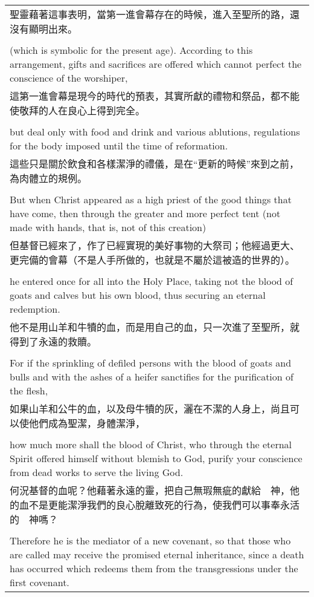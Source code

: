 \begin{tabularx}{\textwidth}{p{}}
聖靈藉著這事表明，當第一進會幕存在的時候，進入至聖所的路，還沒有顯明出來。 \\ \\
(which is symbolic for the present age). According to this arrangement, gifts and sacrifices are offered which cannot perfect the conscience of the worshiper, \\
這第一進會幕是現今的時代的預表，其實所獻的禮物和祭品，都不能使敬拜的人在良心上得到完全。 \\ \\
but deal only with food and drink and various ablutions, regulations for the body imposed until the time of reformation. \\
這些只是關於飲食和各樣潔淨的禮儀，是在“更新的時候”來到之前，為肉體立的規例。 \\ \\
But when Christ appeared as a high priest of the good things that have come, then through the greater and more perfect tent (not made with hands, that is, not of this creation) \\
但基督已經來了，作了已經實現的美好事物的大祭司；他經過更大、更完備的會幕（不是人手所做的，也就是不屬於這被造的世界的）。 \\ \\
he entered once for all into the Holy Place, taking not the blood of goats and calves but his own blood, thus securing an eternal redemption. \\
他不是用山羊和牛犢的血，而是用自己的血，只一次進了至聖所，就得到了永遠的救贖。 \\ \\
For if the sprinkling of defiled persons with the blood of goats and bulls and with the ashes of a heifer sanctifies for the purification of the flesh, \\
如果山羊和公牛的血，以及母牛犢的灰，灑在不潔的人身上，尚且可以使他們成為聖潔，身體潔淨， \\ \\
how much more shall the blood of Christ, who through the eternal Spirit offered himself without blemish to God, purify your conscience from dead works to serve the living God. \\
何況基督的血呢？他藉著永遠的靈，把自己無瑕無疵的獻給　神，他的血不是更能潔淨我們的良心脫離致死的行為，使我們可以事奉永活的　神嗎？ \\ \\
Therefore he is the mediator of a new covenant, so that those who are called may receive the promised eternal inheritance, since a death has occurred which redeems them from the transgressions under the first covenant. \\

\end{tabularx}
